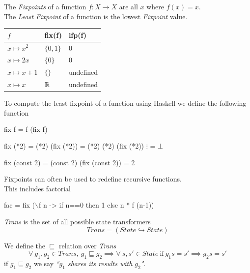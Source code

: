 \documentclass[11pt,a4paper]{article}
\begin{document}
The \textit{Fixpoints} of a function $f:X\to X$ are all $x$ where $f(x)=x$.\\

The \textit{Least Fixpoint} of a function is the lowest \textit{Fixpoint} value.\\

\begin{tabular}{l|l|l}
$f$&fix(f)&lfp(f)\\
\hline
$x\mapsto x^2$&$\{0,1\}$&$0$\\
$x\mapsto 2x$&$\{0\}$&$0$\\
$x\mapsto x+1$&$\{\}$&undefined\\
$x\mapsto x$&$\mathbb{R}$&undefined\\
\end{tabular}

To compute the least fixpoint of a function using Haskell we define the following function
\begin{code}
fix f = f (fix f)
\end{code}

\begin{code}
fix (*2) = (*2) (fix (*2))
         = (*2) (*2) (fix (*2))
         $\vdots$
         = $\bot$

fix (const 2) = (const 2) (fix (const 2))
              = 2
\end{code}

Fixpoints can often be used to redefine recursive functions.\\
This includes factorial
\begin{code}
fac = fix ($\backslash$f n -> if n==0 then 1 else n * f (n-1))
\end{code}

\textit{Trans} is the set of all possible state transformers
$$Trans=(State\hookrightarrow State)$$

We define the $\sqsubseteq$ relation over \textit{Trans}
$$\forall\ g_1,g_2\in Trans,\ g_1\sqsubseteq g_2\implies \forall\ s,s'\in State\ \mathrm{if}\ g_1 s=s'\implies g_2 s=s'$$
\nb if $g_1\sqsubseteq g_2$ we say \textit{``$g_1$ shares its results with $g_2$"}.\\
\end{document}
